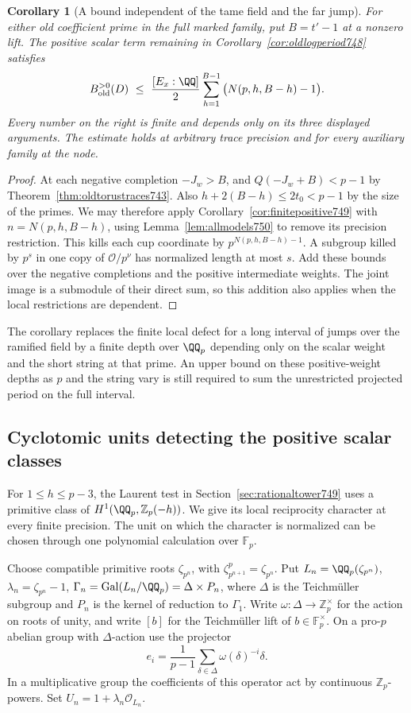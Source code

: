 \documentclass[a4paper,11pt]{article}
\newtheorem{corollary}[proposition]{Corollary}
\theoremstyle{definition}
\theoremstyle{remark}
\newcommand{\ZZ}{\mathbb Z}\newcommand{\ord}{\operatorname{ord}}
\numberwithin{equation}{section}
\begin{document}
\begin{corollary}[A bound independent of the tame field and the far jump]
\leavevmode\label{cor:rationaldepth750}
For either old coefficient prime in the full marked family,
put \(B=t'-1\) at a nonzero lift. The positive scalar term
remaining in Corollary~\ref{cor:oldlogperiod748} satisfies
\[
     B_{\rm old}^{>0}(D)
       \ \le\ \frac{[E_x:\QQ]}2
          \sum_{h=1}^{B-1}\big(N(p,h,B-h)-1\big).
\]
Every number on the right is finite and depends only on its
three displayed arguments. The estimate holds at arbitrary
trace precision and for every auxiliary family at the node.
\end{corollary}
\begin{proof}
At each negative completion \(-J_w>B\), and
\(Q(-J_w+B)<p-1\) by Theorem~\ref{thm:oldtorustraces743}.
Also \(h+2(B-h)\le2t_0<p-1\) by the size of the primes.
We may therefore apply Corollary~\ref{cor:finitepositive749}
with \(n=N(p,h,B-h)\), using Lemma~\ref{lem:allmodels750}
to remove its precision restriction. This kills each cup
coordinate by \(p^{N(p,h,B-h)-1}\). A subgroup killed by
\(p^s\) in one copy of \(\mathcal O/p^\nu\) has normalized
length at most \(s\). Add these bounds over the negative
completions and the positive intermediate weights. The joint
image is a submodule of their direct sum, so this addition
also applies when the local restrictions are dependent.
\end{proof}

The corollary replaces the finite local defect for a long
interval of jumps over the ramified field by a finite depth
over \(\QQ_p\) depending only on the scalar weight and the
short string at that prime. An upper bound on these positive-weight
depths as \(p\) and the string vary is still required to sum
the unrestricted projected period on the full interval.
\clearpage

\subsection{Cyclotomic units detecting the positive scalar classes}
\label{sec:unitcoordinates751}
For \(1\le h\le p-3\), the Laurent test in
Section~\ref{sec:rationaltower749} uses a primitive class of
\(H^1(\QQ_p,\ZZ_p(-h))\). We give its local reciprocity character
at every finite precision. The unit on which the character is
normalized can be chosen through one polynomial calculation over
\(\mathbb F_p\).

Choose compatible primitive roots \(\zeta_{p^n}\), with
\(\zeta_{p^{n+1}}^p=\zeta_{p^n}\). Put \(L_n=\QQ_p(\zeta_{p^n})\),
\(\lambda_n=\zeta_{p^n}-1\),
\(\Gamma_n=\operatorname{Gal}(L_n/\QQ_p)=\Delta\times P_n\), where
\(\Delta\) is the Teichm\"uller subgroup and \(P_n\) is the kernel
of reduction to \(\Gamma_1\). Write
\(\omega:\Delta\longrightarrow\ZZ_p^\times\) for the action on roots
of unity, and write \([b]\) for the Teichm\"uller lift of
\(b\in\mathbb F_p^\times\). On a pro-\(p\) abelian group with
\(\Delta\)-action use the projector
\[
 e_i=\frac1{p-1}\sum_{\delta\in\Delta}\omega(\delta)^{-i}\delta .
\]
In a multiplicative group the coefficients of this operator act by
continuous \(\ZZ_p\)-powers. Set \(U_n=1+\lambda_n\mathcal O_{L_n}\).
\end{document}
